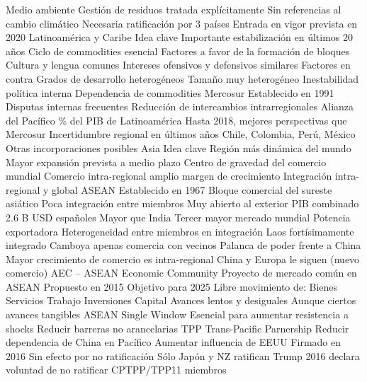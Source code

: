 \documentclass{nuevotema}
\begin{document}
\begin{esquemal}
				\4 Medio ambiente
				\4[] Gestión de residuos tratada explícitamente
				\4[] Sin referencias al cambio climático
				\4 Necesaria ratificación por 3 países
				\4 Entrada en vigor prevista en 2020
		\2 Latinoamérica y Caribe
			\3 Idea clave
				\4 Importante estabilización en últimos 20 años
				\4 Ciclo de commodities esencial
				\4 Factores a favor de la formación de bloques
				\4[] Cultura y lengua comunes
				\4[] Intereses ofensivos y defensivos similares
				\4 Factores en contra
				\4[] Grados de desarrollo heterogéneos
				\4[] Tamaño muy heterogéneo
				\4[] Inestabilidad política interna
				\4[] Dependencia de commodities
			\3 Mercosur
				\4 Establecido en 1991
				\4 Disputas internas frecuentes
				\4 Reducción de intercambios intrarregionales
			\3 Alianza del Pacífico
				\% del PIB de Latinoamérica
				\4 Hasta 2018, mejores perspectivas que Mercosur
				\4 Incertidumbre regional en últimos años
				\4[] Chile, Colombia, Perú, México
				\4[] Otras incorporaciones posibles
		\2 Asia
			\3 Idea clave
				\4 Región más dinámica del mundo
				\4 Mayor expansión prevista a medio plazo
				\4 Centro de gravedad del comercio mundial
				\4 Comercio intra-regional amplio margen de crecimiento
				\4 Integración intra-regional y global
			\3 ASEAN
				\4 Establecido en 1967
				\4 Bloque comercial del sureste asiático
				\4 Poca integración entre miembros
				\4 Muy abierto al exterior
				\4 PIB combinado 2.6 B USD españoles
				\4[] Mayor que India
				\4[] Tercer mayor mercado mundial
				\4 Potencia exportadora
				\4 Heterogeneidad entre miembros en integración
				\4[] Laos fortísimamente integrado
				\4[] Camboya apenas comercia con vecinos
				\4 Palanca de poder frente a China
				\4 Mayor crecimiento de comercio es intra-regional
				\4[] China y Europa le siguen (nuevo comercio)
			\3 AEC -- ASEAN Economic Community
				\4 Proyecto de mercado común en ASEAN
				\4 Propuesto en 2015
				\4 Objetivo para 2025
				\4 Libre movimiento de:
				\4[] Bienes
				\4[] Servicios
				\4[] Trabajo
				\4[] Inversiones
				\4[] Capital
				\4 Avances lentos y desiguales
				\4[] Aunque ciertos avances tangibles
				\4 ASEAN Single Window
				\4 Esencial para aumentar resistencia a shocks
				\4 Reducir barreras no arancelarias
			\3 TPP
				\4 Trans-Pacific Parnership
				\4 Reducir dependencia de China en Pacífico
				\4 Aumentar influencia de EEUU
				\4 Firmado en 2016
				\4 Sin efecto por no ratificación
				\4[] Sólo Japón y NZ ratifican
				\4[] Trump 2016 declara voluntad de no ratificar
			\3 CPTPP/TPP11
				 miembros

\end{esquemal}
\end{document}
